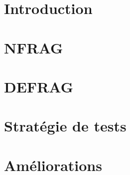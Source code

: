

\usepackage{lipsum}




\newpage
{} %
\begin{spacing}{1.5}
\section{Introduction}

\section{NFRAG}

\section{DEFRAG}

\section{Stratégie de tests}

\section{Améliorations}

\end{spacing}

